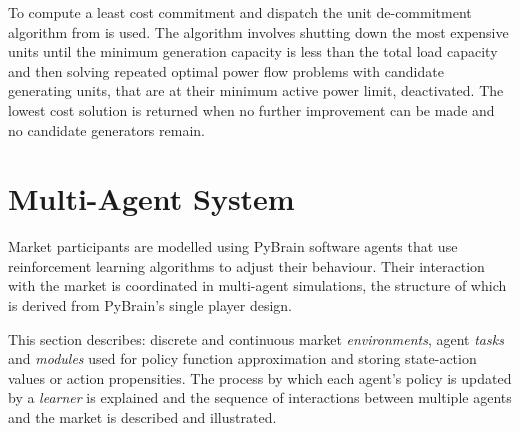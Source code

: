To compute a least cost commitment and dispatch the unit de-commitment algorithm
from  is used.  The algorithm involves shutting
down the most expensive units until the minimum generation capacity is less than
the total load capacity and then solving repeated optimal power flow problems
with candidate generating units, that are at their minimum active power limit,
deactivated.  The lowest cost solution is returned when no further improvement
can be made and no candidate generators remain.

%
%

\section{Multi-Agent System}
\label{sec:mas}
Market participants are modelled using PyBrain \cite{schaul:2010} software
agents that use reinforcement learning algorithms to adjust their behaviour.
Their interaction with the market is coordinated in multi-agent simulations, the
structure of which is derived from PyBrain's single player design.

This section describes: discrete and continuous market \textit{environments},
agent \textit{tasks} and \textit{modules} used for policy function approximation
and storing state-action values or action propensities.  The process by which
each agent's policy is updated by a \textit{learner} is explained and the
sequence of interactions between multiple agents and the market is described and
illustrated.

